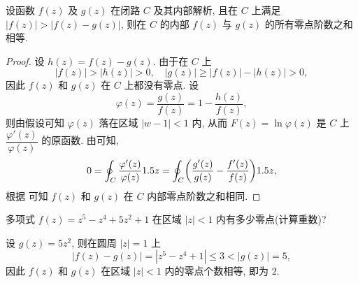 
\begin{theorem}[儒歇定理]
  \label{thm:rouche}
  设函数 $f(z)$ 及 $g(z)$ 在闭路 $C$ 及其内部解析, 且在 $C$ 上满足 $|f(z)|>|f(z)-g(z)|$, 则在 $C$ 的内部 $f(z)$ 与 $g(z)$ 的所有零点阶数之和相等.
\end{theorem}

\begin{proof}
  设 $h(z)=f(z)-g(z)$.
  由于在 $C$ 上
  \[
    |f(z)|>|h(z)|>0,\quad
    |g(z)|\ge |f(z)|-|h(z)|>0,
  \]
  因此 $f(z)$ 和 $g(z)$ 在 $C$ 上都没有零点.
  设
  \[
    \varphi(z)=\dfrac{g(z)}{f(z)}=1-\dfrac{h(z)}{f(z)},
  \]
  则由假设可知 $\varphi(z)$ 落在区域 $|w-1|<1$ 内, 从而 $F(z)=\ln\varphi(z)$ 是 $C$ 上 $\dfrac{\varphi'(z)}{\varphi(z)}$ 的原函数.
  由\thmNL 可知,
  \[
     0
    =\oint_C\frac{\varphi'(z)}{\varphi(z)}1.5 z
    =\oint_C\biggl(\frac{g'(z)}{g(z)}-\frac{f'(z)}{f(z)}\biggr)1.5 z,
  \]
  根据 可知 $f(z)$ 和 $g(z)$ 在 $C$ 内部零点阶数之和相同.
\end{proof}

\begin{example}
  多项式 $f(z)=z^5-z^4+5z^2+1$ 在区域 $|z|<1$ 内有多少零点(计算重数)?
\end{example}

\begin{solution}
  设 $g(z)=5z^2$, 则在圆周 $|z|=1$ 上
  \[
    |f(z)-g(z)|=|z^5-z^4+1|\le 3<|g(z)|=5,
  \]
  因此 $f(z)$ 和 $g(z)$ 在区域 $|z|<1$ 内的零点个数相等, 即为 $2$.
\end{solution}

